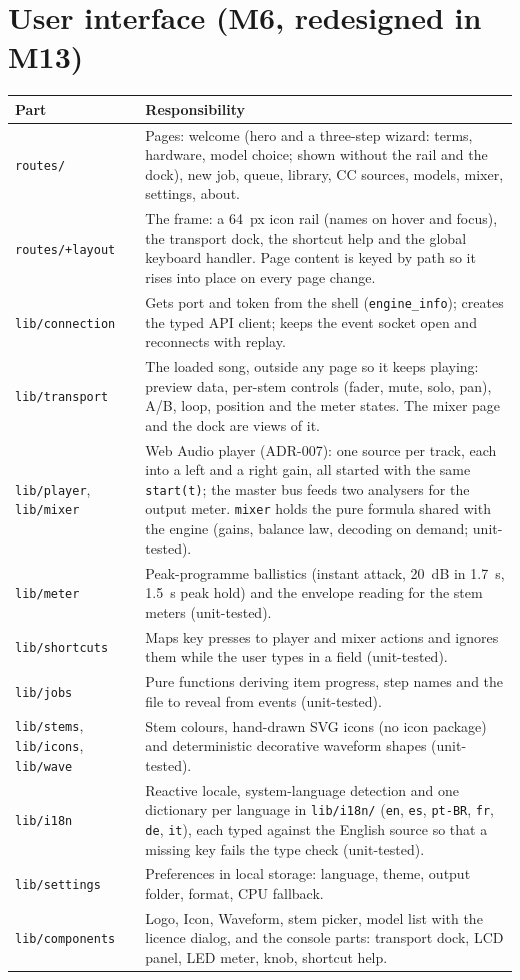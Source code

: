 \documentclass{covermaker}
\begin{document}
\chapter{User interface (M6, redesigned in M13)}
\begin{tabularx}{\linewidth}{@{}lY@{}}
\toprule
\textbf{Part} & \textbf{Responsibility} \\
\midrule
\texttt{routes/} & Pages: welcome (hero and a three-step wizard: terms, hardware, model choice; shown without the rail and the dock), new job, queue, library, CC sources, models, mixer, settings, about. \\
\texttt{routes/+layout} & The frame: a 64~px icon rail (names on hover and focus), the transport dock, the shortcut help and the global keyboard handler. Page content is keyed by path so it rises into place on every page change. \\
\texttt{lib/connection} & Gets port and token from the shell (\texttt{engine\_info}); creates the typed API client; keeps the event socket open and reconnects with replay. \\
\texttt{lib/transport} & The loaded song, outside any page so it keeps playing: preview data, per-stem controls (fader, mute, solo, pan), A/B, loop, position and the meter states. The mixer page and the dock are views of it. \\
\texttt{lib/player}, \texttt{lib/mixer} & Web Audio player (ADR-007): one source per track, each into a left and a right gain, all started with the same \texttt{start(t)}; the master bus feeds two analysers for the output meter. \texttt{mixer} holds the pure formula shared with the engine (gains, balance law, decoding on demand; unit-tested). \\
\texttt{lib/meter} & Peak-programme ballistics (instant attack, 20~dB in 1.7~s, 1.5~s peak hold) and the envelope reading for the stem meters (unit-tested). \\
\texttt{lib/shortcuts} & Maps key presses to player and mixer actions and ignores them while the user types in a field (unit-tested). \\
\texttt{lib/jobs} & Pure functions deriving item progress, step names and the file to reveal from events (unit-tested). \\
\texttt{lib/stems}, \texttt{lib/icons}, \texttt{lib/wave} & Stem colours, hand-drawn SVG icons (no icon package) and deterministic decorative waveform shapes (unit-tested). \\
\texttt{lib/i18n} & Reactive locale, system-language detection and one dictionary per language in \texttt{lib/i18n/} (\texttt{en}, \texttt{es}, \texttt{pt-BR}, \texttt{fr}, \texttt{de}, \texttt{it}), each typed against the English source so that a missing key fails the type check (unit-tested). \\
\texttt{lib/settings} & Preferences in local storage: language, theme, output folder, format, CPU fallback. \\
\texttt{lib/components} & Logo, Icon, Waveform, stem picker, model list with the licence dialog, and the console parts: transport dock, LCD panel, LED meter, knob, shortcut help. \\
\bottomrule
\end{tabularx}
\end{document}
